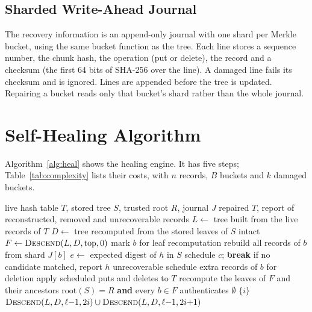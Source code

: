\documentclass[conference]{IEEEtran}
\begin{document}
\subsection{Sharded Write-Ahead Journal}

The recovery information is an append-only journal with one shard per Merkle bucket, using the same bucket function as the tree. Each line stores a sequence number, the chunk hash, the operation (put or delete), the record and a checksum (the first 64 bits of SHA-256 over the line). A damaged line fails its checksum and is ignored. Lines are appended before the tree is updated. Repairing a bucket reads only that bucket's shard rather than the whole journal.

\section{Self-Healing Algorithm}
\label{sec:healing}

Algorithm~\ref{alg:heal} shows the healing engine. It has five steps; Table~\ref{tab:complexity} lists their costs, with $n$ records, $B$ buckets and $k$ damaged buckets.

\begin{algorithm}[t]
\caption{SH-CADI heal}
\label{alg:heal}
\begin{algorithmic}[1]
\Require live hash table $T$, stored tree $S$, trusted root $R$, journal $J$
\Ensure repaired $T$, report of reconstructed, removed and unrecoverable records
\State $L \gets$ tree built from the live records of $T$ 
\State $D \gets$ tree recomputed from the stored leaves of $S$
  \State \Return intact
\EndIf
\State $F \gets \textsc{Descend}(L, D, \mathrm{top}, 0)$ 
 
    \State mark $b$ for leaf recomputation
    \State rebuild all records of $b$ from shard $J[b]$
  \Else
      \State $e \gets$ expected digest of $h$ in $S$
          \State schedule $c$; \textbf{break}
        \EndIf
      \EndFor
      \State if no candidate matched, report $h$ unrecoverable
    \EndFor
    \State schedule extra records of $b$ for deletion
  \EndIf
\EndFor
\State apply scheduled puts and deletes to $T$ 
\State recompute the leaves of $F$ and their ancestors
\State \Return $\mathrm{root}(S) = R$ \textbf{and} every $b \in F$ authenticates 
\Statex
{}
   \Return $\emptyset$ 
  \EndIf
   \Return $\{i\}$
  \EndIf
  \State \Return $\textsc{Descend}(L, D, \ell{-}1, 2i) \cup \textsc{Descend}(L, D, \ell{-}1, 2i{+}1)$
\EndFunction
\end{algorithmic}
\end{algorithm}
\end{document}
